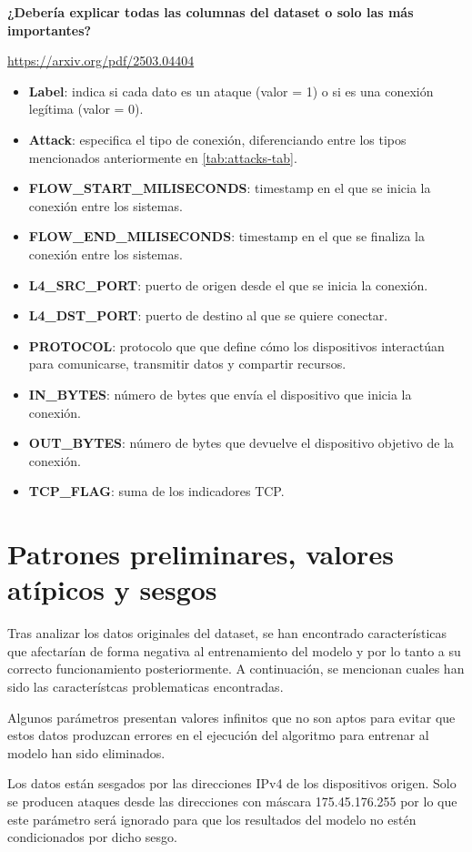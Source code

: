 \textbf{¿Debería explicar todas las columnas del dataset o solo las más importantes?}

\url{https://arxiv.org/pdf/2503.04404}

\begin{itemize}
\item \textbf{Label}: indica si cada dato es un ataque (valor = 1) o si es una conexión legítima (valor = 0).
\item \textbf{Attack}: especifica el tipo de conexión, diferenciando entre los tipos mencionados anteriormente en \ref{tab:attacks-tab}.
\item\textbf{FLOW\_START\_MILISECONDS}: timestamp en el que se inicia la conexión entre los sistemas.
\item\textbf{FLOW\_END\_MILISECONDS}: timestamp en el que se finaliza la conexión entre los sistemas.
\item\textbf{L4\_SRC\_PORT}: puerto de origen desde el que se inicia la conexión.
\item\textbf{L4\_DST\_PORT}: puerto de destino al que se quiere conectar.
\item\textbf{PROTOCOL}: protocolo que que define cómo los dispositivos interactúan para comunicarse, transmitir datos y compartir recursos.
\item\textbf{IN\_BYTES}: número de bytes que envía el dispositivo que inicia la conexión.
\item\textbf{OUT\_BYTES}: número de bytes que devuelve el dispositivo objetivo de la conexión.
\item\textbf{TCP\_FLAG}: suma de los indicadores TCP.
\end{itemize}


\section{Patrones preliminares, valores atípicos y sesgos} \label{sec.segos-datos}

Tras analizar los datos originales del dataset, se han encontrado características que afectarían de forma negativa al entrenamiento del modelo y por lo tanto a su correcto funcionamiento posteriormente. A continuación, se mencionan cuales han sido las característcas problematicas encontradas.


Algunos parámetros presentan valores infinitos que no son aptos para evitar que estos datos produzcan errores en el ejecución del algoritmo para entrenar al modelo han sido eliminados.

Los datos están sesgados por las direcciones IPv4 de los dispositivos origen. Solo se producen ataques desde las direcciones con máscara 175.45.176.255 por lo que este parámetro será ignorado para que los resultados del modelo no estén condicionados por dicho sesgo.



